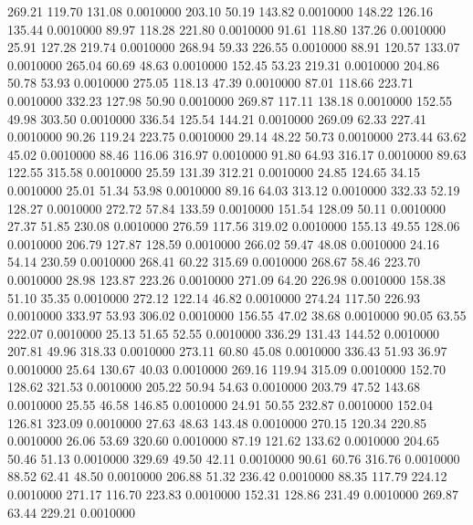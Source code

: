  269.21  119.70  131.08   0.0010000
 203.10   50.19  143.82   0.0010000
 148.22  126.16  135.44   0.0010000
  89.97  118.28  221.80   0.0010000
  91.61  118.80  137.26   0.0010000
  25.91  127.28  219.74   0.0010000
 268.94   59.33  226.55   0.0010000
  88.91  120.57  133.07   0.0010000
 265.04   60.69   48.63   0.0010000
 152.45   53.23  219.31   0.0010000
 204.86   50.78   53.93   0.0010000
 275.05  118.13   47.39   0.0010000
  87.01  118.66  223.71   0.0010000
 332.23  127.98   50.90   0.0010000
 269.87  117.11  138.18   0.0010000
 152.55   49.98  303.50   0.0010000
 336.54  125.54  144.21   0.0010000
 269.09   62.33  227.41   0.0010000
  90.26  119.24  223.75   0.0010000
  29.14   48.22   50.73   0.0010000
 273.44   63.62   45.02   0.0010000
  88.46  116.06  316.97   0.0010000
  91.80   64.93  316.17   0.0010000
  89.63  122.55  315.58   0.0010000
  25.59  131.39  312.21   0.0010000
  24.85  124.65   34.15   0.0010000
  25.01   51.34   53.98   0.0010000
  89.16   64.03  313.12   0.0010000
 332.33   52.19  128.27   0.0010000
 272.72   57.84  133.59   0.0010000
 151.54  128.09   50.11   0.0010000
  27.37   51.85  230.08   0.0010000
 276.59  117.56  319.02   0.0010000
 155.13   49.55  128.06   0.0010000
 206.79  127.87  128.59   0.0010000
 266.02   59.47   48.08   0.0010000
  24.16   54.14  230.59   0.0010000
 268.41   60.22  315.69   0.0010000
 268.67   58.46  223.70   0.0010000
  28.98  123.87  223.26   0.0010000
 271.09   64.20  226.98   0.0010000
 158.38   51.10   35.35   0.0010000
 272.12  122.14   46.82   0.0010000
 274.24  117.50  226.93   0.0010000
 333.97   53.93  306.02   0.0010000
 156.55   47.02   38.68   0.0010000
  90.05   63.55  222.07   0.0010000
  25.13   51.65   52.55   0.0010000
 336.29  131.43  144.52   0.0010000
 207.81   49.96  318.33   0.0010000
 273.11   60.80   45.08   0.0010000
 336.43   51.93   36.97   0.0010000
  25.64  130.67   40.03   0.0010000
 269.16  119.94  315.09   0.0010000
 152.70  128.62  321.53   0.0010000
 205.22   50.94   54.63   0.0010000
 203.79   47.52  143.68   0.0010000
  25.55   46.58  146.85   0.0010000
  24.91   50.55  232.87   0.0010000
 152.04  126.81  323.09   0.0010000
  27.63   48.63  143.48   0.0010000
 270.15  120.34  220.85   0.0010000
  26.06   53.69  320.60   0.0010000
  87.19  121.62  133.62   0.0010000
 204.65   50.46   51.13   0.0010000
 329.69   49.50   42.11   0.0010000
  90.61   60.76  316.76   0.0010000
  88.52   62.41   48.50   0.0010000
 206.88   51.32  236.42   0.0010000
  88.35  117.79  224.12   0.0010000
 271.17  116.70  223.83   0.0010000
 152.31  128.86  231.49   0.0010000
 269.87   63.44  229.21   0.0010000
